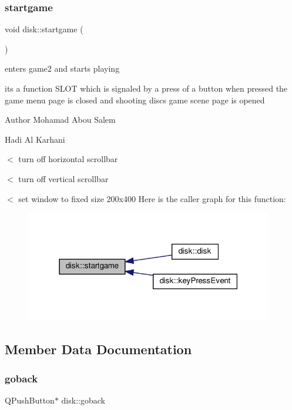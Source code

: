 \subsubsection{\texorpdfstring{startgame}{startgame}}
{\footnotesize\ttfamily void disk\+::startgame (\begin{DoxyParamCaption}{ }\end{DoxyParamCaption})\hspace{0.3cm}{\ttfamily [slot]}}



enters game2 and starts playing 

its a function S\+L\+OT which is signaled by a press of a button when pressed the game menu page is closed and shooting discs game scene page is opened

\begin{DoxyAuthor}{Author}
Mohamad Abou Salem 

Hadi Al Karhani 
\end{DoxyAuthor}
$<$ turn off horizontal scrollbar

$<$ turn off vertical scrollbar

$<$ set window to fixed size 200x400 Here is the caller graph for this function\+:
\nopagebreak
\begin{figure}[H]
\begin{center}
\leavevmode
\includegraphics[width=307pt]{classdisk_a5b39c1a38b5a5c337c6b60470b9ef748_icgraph}
\end{center}
\end{figure}


\subsection{Member Data Documentation}
\mbox{\label{classdisk_abc6a3e9a9d9b0fba08c96c4d099ffd84}} 
\subsubsection{\texorpdfstring{goback}{goback}}
{\footnotesize\ttfamily Q\+Push\+Button$\ast$ disk\+::goback\hspace{0.3cm}{\ttfamily [private]}}

